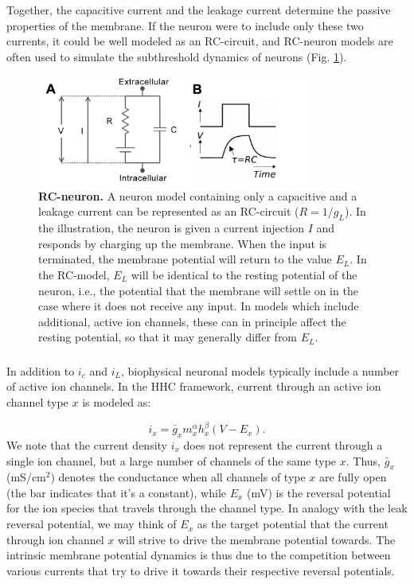 Together, the capacitive current and the leakage current determine the passive properties of the membrane. If the neuron were to include only these two currents, it could be well modeled as an RC-circuit, and RC-neuron models are often used to simulate the subthreshold dynamics of neurons (Fig. \ref{Neuron:fig:RC}). 

\begin{figure}[!ht]
\begin{center}
\includegraphics[width=0.8\textwidth]{Figures/Neuron/RCneuron.png}
\end{center}
\caption{\textbf{RC-neuron.}  A neuron model containing only a capacitive and a leakage current can be represented as an RC-circuit ($R = 1/g_L$). In the illustration, the neuron is given a current injection $I$ and responds by charging up the membrane. When the input is terminated, the membrane potential will return to the value $E_L$. In the RC-model, $E_L$ will be identical to the resting potential of the neuron, i.e., the potential that the membrane will settle on in the case where it does not receive any input. In models which include additional, active ion channels, these can in principle affect the resting potential, so that it may generally differ from $E_L$.
}
\label{Neuron:fig:RC}
\end{figure}


\subsubsection{}
\label{sec:Neuron:active}
In addition to $i_c$ and $i_L$, biophysical neuronal models typically include a number of active ion channels. In the HHC framework, current through an active ion channel type $x$ is modeled as:

\begin{equation}
i_x = \bar{g}_x m_x^{\alpha} h_x^{\beta}(V-E_x).
\label{Neuron:eq:HHform}
\end{equation}
We note that the current density $i_x$ does not represent the current through a single ion channel, but a large number of channels of the same type $x$. Thus, $\bar{g}_x$ (mS/cm$^2$) denotes the conductance when all channels of type $x$ are fully open (the bar indicates that it's a constant), while $E_x$ (mV) is the reversal potential for the ion species that travels through the channel type. In analogy with the leak reversal potential, we may think of $E_x$ as the target potential that the current through ion channel $x$ will strive to drive the membrane potential towards. The intrinsic membrane potential dynamics is thus due to the competition between various currents that try to drive it towards their respective reversal potentials. 

